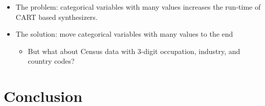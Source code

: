 \documentclass[t,8pt,utfx8]{beamer}
\begin{document}
\begin{spacing}{1.25}
{\begin{itemize}
    \item The problem: categorical variables with many values increases the run-time of CART based synthesizers.
    \item The solution: move categorical variables with many values to the end
    \begin{itemize}
        \item But what about Census data with 3-digit occupation, industry, and country codes?
    \end{itemize}
\end{itemize}
}


\section{Conclusion}\label{sec:conclusion}
\end{spacing}
\end{document}
